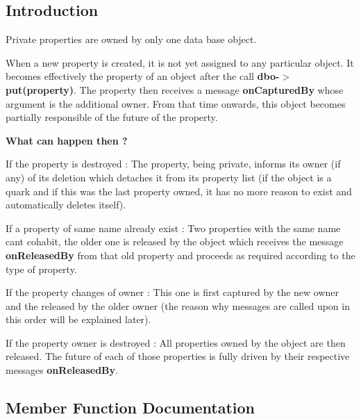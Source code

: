 \hypertarget{classHurricane_1_1PrivateProperty_secPrivatePropertyIntro}{}\subsection{Introduction}\label{classHurricane_1_1PrivateProperty_secPrivatePropertyIntro}
Private properties are owned by only one data base object.

When a new property is created, it is not yet assigned to any particular object. It becomes effectively the property of an object after the call {\bfseries dbo-\/$>$put(property)}. The property then receives a message {\bfseries on\+Captured\+By} whose argument is the additional owner. From that time onwards, this object becomes partially responsible of the future of the property.

{\bfseries What can happen then ?}

If the property is destroyed \+: The property, being private, informs its owner (if any) of its deletion which detaches it from its property list (if the object is a quark and if this was the last property owned, it has no more reason to exist and automatically deletes itself).

If a property of same name already exist \+: Two properties with the same name can\textquotesingle{}t cohabit, the older one is released by the object which receives the message {\bfseries on\+Released\+By} from that old property and proceeds as required according to the type of property.

If the property changes of owner \+: This one is first captured by the new owner and the released by the older owner (the reason why messages are called upon in this order will be explained later).

If the property owner is destroyed \+: All properties owned by the object are then released. The future of each of those properties is fully driven by their respective messages {\bfseries on\+Released\+By}. 

\subsection{Member Function Documentation}
\mbox{\label{classHurricane_1_1PrivateProperty_a070ea464f4859734163b12a134e2d8f2}} 
